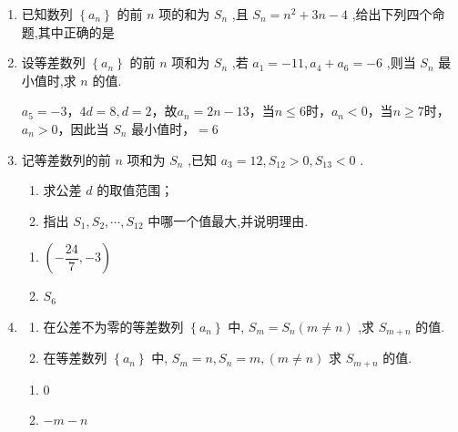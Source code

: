 \begin{enumerate}
    \item 已知数列 $\left\{  {a}_{n}\right\}$ 的前 $n$ 项的和为 ${S}_{n}$ ,且 ${S}_{n} = {n}^{2} + {3n} - 4$ ,给出下列四个命题,其中正确的是

    \item 设等差数列 $\left\{  {a}_{n}\right\}$ 的前 $n$ 项和为 ${S}_{n}$ ,若 ${a}_{1} =  - {11},{a}_{4} + {a}_{6} =  - 6$ ,则当 ${S}_{n}$ 最小值时,求 $n$ 的值.
    \begin{jieda}
        $a_5 = -3$，$4d = 8, d = 2$，故$a_n = 2n-13$，当$n \leq 6$时，$a_n < 0$，当$n \geq 7$时，$a_n > 0$，因此当 ${S}_{n}$ 最小值时，$ = 6$
    \end{jieda}

    \item 记等差数列的前 $n$ 项和为 ${S}_{n}$ ,已知 ${a}_{3} = {12},{S}_{12} > 0,{S}_{13} < 0$ .
    \begin{enumerate}
        \item 求公差 $d$ 的取值范围；
        \item 指出 ${S}_{1},{S}_{2},\cdots ,{S}_{12}$ 中哪一个值最大,并说明理由.
    \end{enumerate}
    \begin{jieda}
        \begin{enumerate}
            \item $\left(-\dfrac{24}{7}, -3\right)$
            \item $S_6$
        \end{enumerate}
    \end{jieda}
    \item \begin{enumerate}
        \item 在公差不为零的等差数列 $\left\{  {a}_{n}\right\}$ 中, ${S}_{m} = {S}_{n}\left( {m \neq  n}\right)$ ,求 ${S}_{m + n}$ 的值.
        \item 在等差数列 $\left\{  {a}_{n}\right\}$ 中, ${S}_{m} = n,{S}_{n} = m,\left( {m \neq  n}\right)$ 求 ${S}_{m + n}$ 的值.
    \end{enumerate}
    \begin{jieda}
        \begin{enumerate}
            \item 0
            \item $-m-n$
        \end{enumerate}
    \end{jieda}


\end{enumerate}
